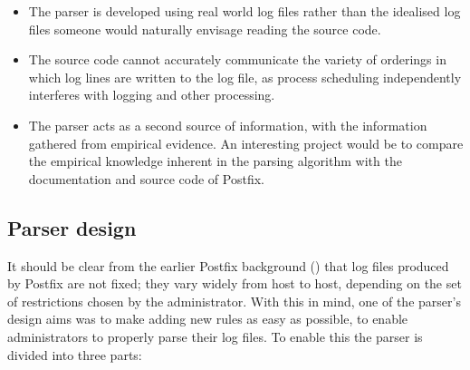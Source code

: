 \begin{itemize}

    \item The parser is developed using real world log files rather than
        the idealised log files someone would naturally envisage reading
        the source code.

    \item The source code cannot accurately communicate the variety of
        orderings in which log lines are written to the log file, as
        process scheduling independently interferes with logging and other
        processing.

    \item The parser acts as a second source of information, with the
        information gathered from empirical evidence.  An interesting
        project would be to compare the empirical knowledge inherent in the
        parsing algorithm with the documentation and source code of
        Postfix.

\end{itemize}


\subsection{Parser design}

\label{parser design}

It should be clear from the earlier Postfix background () that log files produced by Postfix are not fixed; they vary
widely from host to host, depending on the set of restrictions chosen by
the administrator.  With this in mind, one of the parser's design aims was
to make adding new rules as easy as possible, to enable administrators to
properly parse their log files.  To enable this the parser is divided into
three parts:

